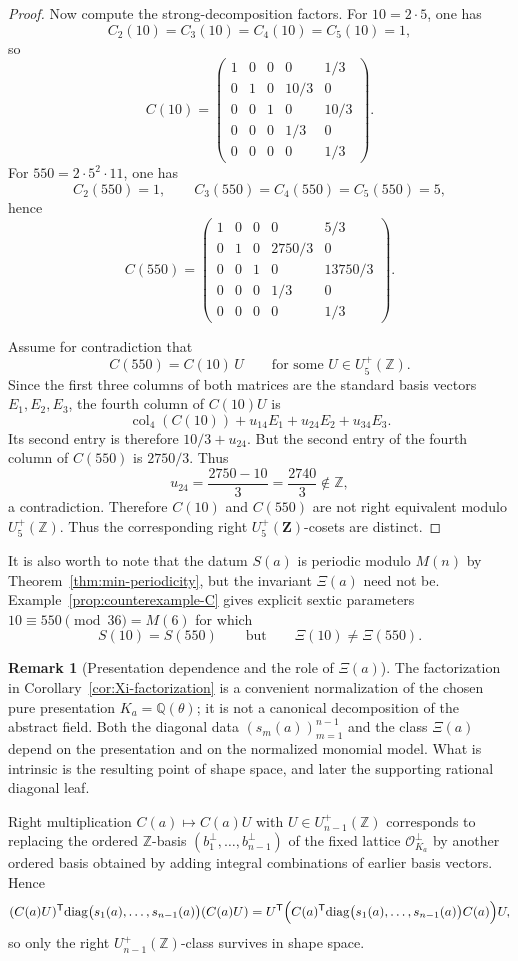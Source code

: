 \documentclass[11pt,letterpaper]{amsart}
\newcommand{\Q}{\mathbb{Q}}
\newcommand{\Z}{\mathbb{Z}}
\newcommand{\cO}{\mathcal{O}}
\newcommand{\diag}{\mathrm{diag}}
\theoremstyle{plain}
\theoremstyle{definition}
\newtheorem{remark}[theorem]{Remark}
\begin{document}
\begin{proof}
Now compute the strong-decomposition factors.
For $10=2\cdot 5$, one has
\[
C_2(10)=C_3(10)=C_4(10)=C_5(10)=1,
\]
so
\[
C(10)=
\begin{pmatrix}
1&0&0&0&1/3\\
0&1&0&10/3&0\\
0&0&1&0&10/3\\
0&0&0&1/3&0\\
0&0&0&0&1/3
\end{pmatrix}.
\]
For $550=2\cdot 5^2\cdot 11$, one has
\[
C_2(550)=1,\qquad C_3(550)=C_4(550)=C_5(550)=5,
\]
hence
\[
C(550)=
\begin{pmatrix}
1&0&0&0&5/3\\
0&1&0&2750/3&0\\
0&0&1&0&13750/3\\
0&0&0&1/3&0\\
0&0&0&0&1/3
\end{pmatrix}.
\]

Assume for contradiction that
\[
C(550)=C(10)\,U
\qquad\text{for some }U\in U_5^+(\Z).
\]
Since the first three columns of both matrices are the standard basis vectors $E_1,E_2,E_3$, the fourth column of
$C(10)U$ is
\[
\operatorname{col}_4(C(10))+u_{14}E_1+u_{24}E_2+u_{34}E_3.
\]
Its second entry is therefore $10/3+u_{24}$.
But the second entry of the fourth column of $C(550)$ is $2750/3$.
Thus
\[
u_{24}=\frac{2750-10}{3}=\frac{2740}{3}\notin \Z,
\]
a contradiction.
Therefore \(C(10)\) and \(C(550)\) are not right equivalent modulo
\(U_5^+(\Z)\). Thus the corresponding right $U_5^+(\mathbf Z)$-cosets are distinct. 
\end{proof}

It is also worth to note that the datum $S(a)$ is periodic modulo $M(n)$ by Theorem~\ref{thm:min-periodicity}, but the
invariant $\Xi(a)$ need not be.
Example~\ref{prop:counterexample-C} gives explicit sextic parameters $10\equiv 550\pmod{36}=M(6)$ for which
\[
S(10)=S(550)\qquad\text{but}\qquad \Xi(10)\neq \Xi(550).
\]

\begin{remark}[Presentation dependence and the role of \(\Xi(a)\)]
\label{rem:Xi-noncanonical}
\label{rem:holmes-corrected}
\label{rem:sextic-corrected}
The factorization in Corollary~\ref{cor:Xi-factorization} is a convenient
normalization of the chosen pure presentation \(K_a=\Q(\theta)\); it is not a
canonical decomposition of the abstract field.  Both the diagonal data
\((s_m(a))_{m=1}^{n-1}\) and the class \(\Xi(a)\) depend on the presentation
and on the normalized monomial model.  What is intrinsic is the resulting point
of shape space, and later the supporting rational diagonal leaf.

Right multiplication \(C(a)\mapsto C(a)U\) with
\(U\in U_{n-1}^+(\Z)\) corresponds to replacing the ordered \(\Z\)-basis
\((b_1^\perp,\dots,b_{n-1}^\perp)\) of the fixed lattice
\(\cO_{K_a}^\perp\) by another ordered basis obtained by adding integral
combinations of earlier basis vectors.  Hence
\[
(C(a)U)^{\mathsf T}\diag\bigl(s_1(a),\dots,s_{n-1}(a)\bigr)(C(a)U)
=
U^{\mathsf T}
\Bigl(
C(a)^{\mathsf T}\diag\bigl(s_1(a),\dots,s_{n-1}(a)\bigr)C(a)
\Bigr)U,
\]
so only the right \(U_{n-1}^+(\Z)\)-class survives in shape space.
\end{remark}
\end{document}
